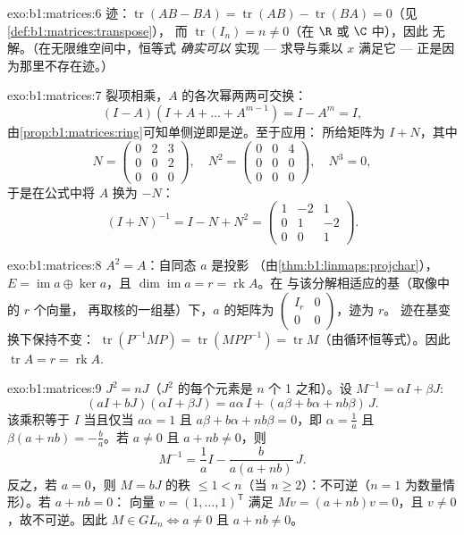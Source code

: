 \begin{solution}{exo:b1:matrices:6}
迹：$\operatorname{tr}(AB - BA) = \operatorname{tr}(AB) -
\operatorname{tr}(BA) = 0$（见\cref{def:b1:matrices:transpose}），
而 $\operatorname{tr}(I_n) = n \neq 0$（在 $\R$ 或 $\C$ 中），因此
无解。（在无限维空间中，恒等式 \emph{确实可以}
实现 --- 求导与乘以 $x$ 满足它
--- 正是因为那里不存在迹。）
\end{solution}

\begin{solution}{exo:b1:matrices:7}
裂项相乘，$A$ 的各次幂两两可交换：
\[
(I - A)(I + A + \dots + A^{m-1}) = I - A^m = I ,
\]
由\cref{prop:b1:matrices:ring}可知单侧逆即是逆。至于应用：
所给矩阵为 $I + N$，其中
\[
N = \begin{pmatrix} 0 & 2 & 3\\ 0 & 0 & 2\\ 0&0&0 \end{pmatrix},
\quad
N^2 = \begin{pmatrix} 0&0&4\\ 0&0&0\\ 0&0&0\end{pmatrix},
\quad N^3 = 0 ,
\]
于是在公式中将 $A$ 换为 $-N$：
\[
(I + N)^{-1} = I - N + N^2 =
\begin{pmatrix}
1 & -2 & 1\\
0 & 1 & -2\\
0 & 0 & 1
\end{pmatrix}.
\]
\end{solution}

\begin{solution}{exo:b1:matrices:8}
$A^2 = A$：自同态 $a$ 是投影
（由\cref{thm:b1:linmaps:projchar}），$E = \operatorname{im} a \oplus
\ker a$，且 $\dim\operatorname{im} a = r = \operatorname{rk} A$。在
与该分解相适应的基（取像中的 $r$ 个向量，
再取核的一组基）下，$a$ 的矩阵为
$\begin{pmatrix} I_r & 0\\ 0 & 0\end{pmatrix}$，迹为 $r$。
迹在基变换下保持不变：
$\operatorname{tr}(P^{-1}MP) = \operatorname{tr}(MPP^{-1}) =
\operatorname{tr} M$（由循环恒等式）。因此
$\operatorname{tr} A = r = \operatorname{rk} A$.
\end{solution}

\begin{solution}{exo:b1:matrices:9}
$J^2 = nJ$（$J^2$ 的每个元素是 $n$ 个 1 之和）。设 $M^{-1} =
\alpha I + \beta J$:
\[
(aI + bJ)(\alpha I + \beta J)
= a\alpha\, I + (a\beta + b\alpha + nb\beta)\, J .
\]
该乘积等于 $I$ 当且仅当 $a\alpha = 1$ 且 $a\beta + b\alpha + nb\beta =
0$，即 $\alpha = \frac1a$ 且 $\beta(a + nb) = -\frac ba$。若 $a
\neq 0$ 且 $a + nb \neq 0$，则
\[
M^{-1} = \frac 1a I - \frac{b}{a(a + nb)}\, J .
\]
反之，若 $a = 0$，则 $M = bJ$ 的秩 $\leq 1 < n$（当 $n \geq
2$）：不可逆（$n = 1$ 为数量情形）。若 $a + nb = 0$：
向量 $v = (1, \dots, 1)^{\mathsf T}$ 满足 $Mv = (a +
nb)v = 0$，且 $v \neq 0$，故不可逆。因此 $M \in GL_n \iff a
\neq 0$ 且 $a + nb \neq 0$。
\end{solution}

